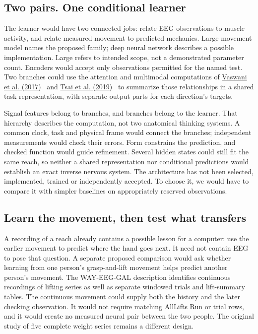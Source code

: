 \subsection{Two pairs. One conditional learner}
The learner would have two connected jobs: relate EEG observations to muscle
activity, and relate measured movement to predicted mechanics. Large movement
model names the proposed family; deep neural network describes a possible
implementation. Large refers to intended scope, not a demonstrated parameter
count. Encoders would accept only observations permitted for the named test.
Two branches could use the attention and multimodal computations of
\href{https://arxiv.org/html/1706.03762v7}{Vaswani et al. (2017)}~\cite{vaswani2017} and \href{https://aclanthology.org/P19-1656/}{Tsai et al. (2019)}~\cite{tsai2019} to summarize those relationships
in a shared task representation, with separate output parts for each direction's targets.


Signal features belong to branches, and branches belong to the learner.
That hierarchy describes the computation, not two anatomical thinking systems.
A common clock, task and physical frame would connect the branches; independent
measurements would check their errors. Form constrains the prediction, and
checked function would guide refinement. Several hidden states could still
fit the same reach, so neither a shared representation nor conditional
predictions would establish an exact inverse nervous system. The architecture
has not been selected, implemented, trained or independently accepted.
To choose it, we would have to compare it with simpler baselines on
appropriately reserved observations.

\subsection{Learn the movement, then test what transfers}

A recording of a reach already contains a possible lesson for a computer: use the earlier movement to predict where the hand goes next. It need not contain EEG to pose that question. A separate proposed comparison would ask whether learning from one person's grasp-and-lift movement helps predict another person's movement. The WAY-EEG-GAL description identifies continuous recordings of lifting series as well as separate windowed trials and lift-summary tables.\citep{luciw2014way} The continuous movement could supply both the history and the later checking observation. It would not require matching AllLifts Run or trial rows, and it would create no measured neural pair between the two people. The original study of five complete weight series remains a different design.

